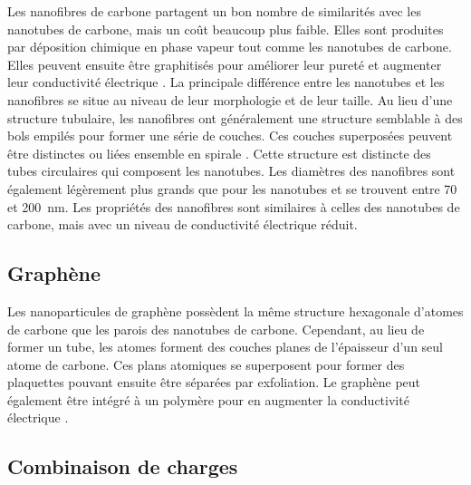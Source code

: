Les nanofibres de carbone partagent un bon nombre de similarités avec les nanotubes de carbone, mais un coût beaucoup plus faible. 
Elles sont produites par déposition chimique en phase vapeur tout comme les nanotubes de carbone. 
Elles peuvent ensuite être graphitisés pour améliorer leur pureté et augmenter leur conductivité électrique \cite{Al-Saleh2009c}. 
La principale différence entre les nanotubes et les nanofibres se situe au niveau de leur morphologie et de leur taille. 
Au lieu d'une structure tubulaire, les nanofibres ont généralement une structure semblable à des bols empilés pour former une série de couches. 
Ces couches superposées peuvent être distinctes ou liées ensemble en spirale \cite{Al-Saleh2009c}. 
Cette structure est distincte des tubes circulaires qui composent les nanotubes. 
Les diamètres des nanofibres sont également légèrement plus grands que pour les nanotubes et se trouvent entre 70 et \SI{200}{\nano\metre}. 
Les propriétés des nanofibres sont similaires à celles des nanotubes de carbone, mais avec un niveau de conductivité électrique réduit. 

\subsection{Graphène}

Les nanoparticules de graphène possèdent la même structure hexagonale d'atomes de carbone que les parois des nanotubes de carbone. 
Cependant, au lieu de former un tube, les atomes forment des couches planes de l'épaisseur d'un seul atome de carbone. 
Ces plans atomiques se superposent pour former des plaquettes pouvant ensuite être séparées par exfoliation. 
Le graphène peut également être intégré à un polymère pour en augmenter la conductivité électrique \cite{Jin2013,Wu2012a,Dweiri2015}. 

\subsection{Combinaison de charges}

